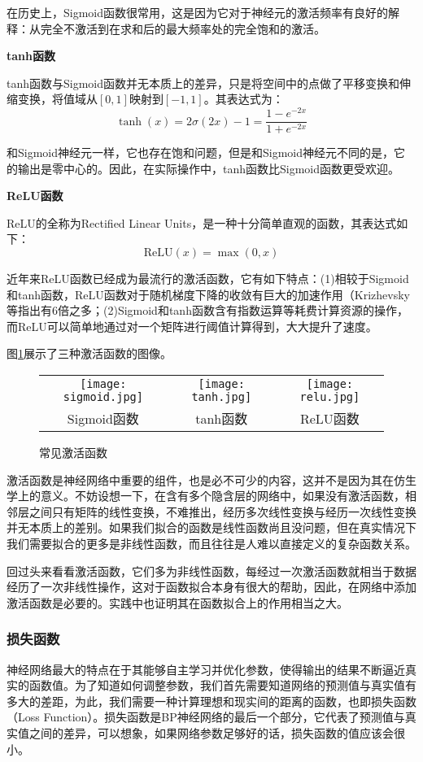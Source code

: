 \documentclass[bwprint]{cumcmthesis}
\begin{document}
在历史上，Sigmoid函数很常用，这是因为它对于神经元的激活频率有良好的解释：从完全不激活到在求和后的最大频率处的完全饱和的激活\cite{cs231n}。

\textbf{tanh函数}

tanh函数与Sigmoid函数并无本质上的差异，只是将空间中的点做了平移变换和伸缩变换，将值域从$[0,1]$映射到$[-1,1]$。其表达式为：
\[\tanh (x) = 2\sigma (2x) - 1 = \frac{1-e^{-2x}}{1+e^{-2x}}\]

和Sigmoid神经元一样，它也存在饱和问题，但是和Sigmoid神经元不同的是，它的输出是零中心的。因此，在实际操作中，tanh函数比Sigmoid函数更受欢迎。

\textbf{ReLU函数}

ReLU的全称为Rectified Linear Units，是一种十分简单直观的函数，其表达式如下：
\[\mathrm{ReLU}(x) = \max(0,x)\]

近年来ReLU函数已经成为最流行的激活函数，它有如下特点：(1)相较于Sigmoid和tanh函数，ReLU函数对于随机梯度下降的收敛有巨大的加速作用（Krizhevsky等指出有6倍之多\cite{Alex2012NIPS}；(2)Sigmoid和tanh函数含有指数运算等耗费计算资源的操作，而ReLU可以简单地通过对一个矩阵进行阈值计算得到，大大提升了速度\cite{cs231n}。

图\ref{ActivationFunction}展示了三种激活函数的图像。
\begin{figure}[!h]
	\centering
	\begin{tabular}{c|c|c} 
		\texttt{[image: sigmoid.jpg]} &
		\texttt{[image: tanh.jpg]} &
		\texttt{[image: relu.jpg]} \\
		Sigmoid函数 & tanh函数 & ReLU函数\\
	\end{tabular}
	\caption{常见激活函数\cite{cs231n}}
	\label{ActivationFunction}
\end{figure}

激活函数是神经网络中重要的组件，也是必不可少的内容，这并不是因为其在仿生学上的意义。不妨设想一下，在含有多个隐含层的网络中，如果没有激活函数，相邻层之间只有矩阵的线性变换，不难推出，经历多次线性变换与经历一次线性变换并无本质上的差别。如果我们拟合的函数是线性函数尚且没问题，但在真实情况下我们需要拟合的更多是非线性函数，而且往往是人难以直接定义的复杂函数关系。

回过头来看看激活函数，它们多为非线性函数，每经过一次激活函数就相当于数据经历了一次非线性操作，这对于函数拟合本身有很大的帮助，因此，在网络中添加激活函数是必要的。实践中也证明其在函数拟合上的作用相当之大。

\subsubsection{损失函数}
神经网络最大的特点在于其能够自主学习并优化参数，使得输出的结果不断逼近真实的函数值。为了知道如何调整参数，我们首先需要知道网络的预测值与真实值有多大的差距，为此，我们需要一种计算理想和现实间的距离的函数，也即损失函数（Loss Function）。损失函数是BP神经网络的最后一个部分，它代表了预测值与真实值之间的差异，可以想象，如果网络参数足够好的话，损失函数的值应该会很小。
\end{document}
